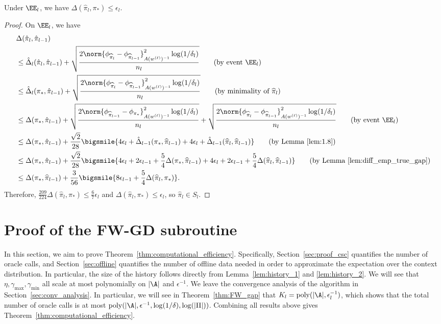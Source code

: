 \documentclass{article}
\newcommand{\pil}{\widehat{\pi}_{l}}
\newcommand{\pill}{\widehat{\pi}_{l-1}}
\newcommand{\1}{\mathbf{1}}
\begin{document}
\begin{lemma}
Under $\EE_l$, we have $\Delta(\hat{\pi}_l,\pi_*)\leq \epsilon_l$. 
\end{lemma}
\begin{proof}
On $\EE_l$, we have 
\begin{align*}
    &\Delta(\hat{\pi}_l, \hat{\pi}_{l-1})\\ &\leq\hat{\Delta}_{l}(\hat{\pi}_l, \hat{\pi}_{l-1})+\sqrt{\frac{2\norm{\phi_{\pil}-\phi_{\pill}}_{A(w^{(\ell)})^{-1}}^2\log(1/\delta_l)}{n_l}}\tag{by event $\EE_l$}\\ &\leq\hat{\Delta}_{l}(\pi_*, \hat{\pi}_{l-1})+\sqrt{\frac{2\norm{\phi_{\pil}-\phi_{\pill}}_{A(w^{(\ell)})^{-1}}^2\log(1/\delta_l)}{n_l}}\tag{by minimality of $\pil$}\\
    &\leq\Delta(\pi_*, \hat{\pi}_{l-1})+\sqrt{\frac{2\norm{\phi_{\pill}-\phi_{\pi_*}}_{A(w^{(\ell)})^{-1}}^2\log(1/\delta_l)}{n_l}}+\sqrt{\frac{2\norm{\phi_{\pil}-\phi_{\pill}}_{A(w^{(\ell)})^{-1}}^2\log(1/\delta_l)}{n_l}}\tag{by event $\EE_l$}\\
    &\leq \Delta(\pi_*, \hat{\pi}_{l-1})+\frac{\sqrt{2}}{28}\bigsmile{4\epsilon_{l}+\hat{\Delta}_{l-1}(\pi_*,\pill)+4\epsilon_{l}+\hat{\Delta}_{l-1}(\pil,\pill)}\tag{by Lemma~\ref{lem:1.8}}\\
    &\leq \Delta(\pi_*, \hat{\pi}_{l-1})+\frac{\sqrt{2}}{28}\bigsmile{4\epsilon_{l}+2\epsilon_{l-1}+\frac{5}{4}\Delta(\pi_*,\pill)+4\epsilon_{l}+2\epsilon_{l-1}+\frac{5}{4}\Delta(\pil,\pill)}\tag{by Lemma~\ref{lem:diff_emp_true_gap}}\\
    &\leq\Delta(\pi_*,\pill)+\frac{3}{56}\bigsmile{8\epsilon_{l-1}+\frac{5}{4}\Delta(\pil,\pi_*)}.
\end{align*}
Therefore, $\frac{209}{224}\Delta(\pil,\pi_*)\leq \frac{6}{7}\epsilon_{l}$ and $\Delta(\pil,\pi_*)\leq\epsilon_l$, so $\pil\in S_l$.
\end{proof}

\section{Proof of the \textsf{FW-GD} subroutine}\label{sec:proof_FW_GD}

In this section, we aim to prove Theorem~\ref{thm:computational_efficiency}. Specifically, Section~\ref{sec:proof_csc} quantifies the number of oracle calls, and Section~\ref{sec:offline} quantifies the number of offline data needed in order to approximate the expectation over the context distribution. In particular, the size of the history follows directly from Lemma~\ref{lem:history_1} and \ref{lem:history_2}. We will see that $\eta,\gamma_{\max},\gamma_{\min}$ all scale at most polynomially on $|\A|$ and $\epsilon^{-1}$. We leave the convergence analysis of the algorithm in Section~\ref{sec:conv_analysis}. In particular, we will see in Theorem~\ref{thm:FW_gap} that $K_l=\operatorname{poly}(|\A|,\epsilon_l^{-1})$, which shows that the total number of oracle calls is at most $\operatorname{poly}(|\A|,\epsilon^{-1},\log(1/\delta),\log(|\Pi|))$. Combining all results above gives Theorem~\ref{thm:computational_efficiency}. 
\end{document}
